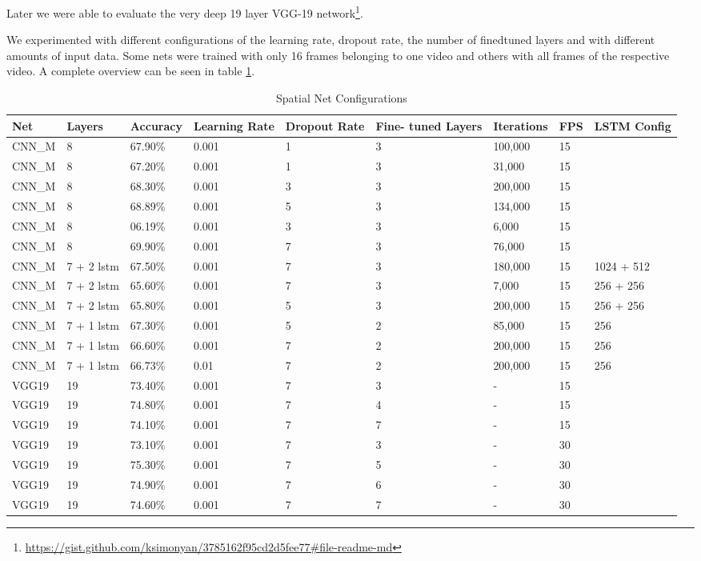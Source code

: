 Later we were able to evaluate the very deep 19 layer VGG-19 \cite{simonyan2014very} network\footnote{\url{https://gist.github.com/ksimonyan/3785162f95cd2d5fee77\#file-readme-md}}.

We experimented with different configurations of the learning rate, dropout rate, the number of finedtuned layers and with different amounts of input data. Some nets were trained with only 16 frames belonging to one video and others with all frames of the respective video. A complete overview can be seen in table \ref{table:spatial_results}.

\begin{table}[H]
\centering
\caption{Spatial Net Configurations}
\label{table:spatial_results}
\begin{tabularx}{\textwidth}{XXXXXXXXX}
\toprule
Net & Layers & Accuracy	& Learning Rate & Dropout Rate & Fine- tuned Layers	& Iterations	& FPS & LSTM Config \\ \midrule

CNN\_M & 8          & 67.90\% & 0.001 & 1 & 3 & 100,000 & 15 & \\
CNN\_M & 8          & 67.20\% & 0.001 & 1 & 3 &  31,000 & 15 & \\
CNN\_M & 8          & 68.30\% & 0.001 & 3 & 3 & 200,000 & 15 & \\
CNN\_M & 8          & 68.89\% & 0.001 & 5 & 3 & 134,000 & 15 & \\
CNN\_M & 8          & 06.19\% & 0.001 & 3 & 3 &   6,000 & 15 & \\
CNN\_M & 8          & 69.90\% & 0.001 & 7 & 3 &  76,000 & 15 & \\
CNN\_M & 7 + 2 lstm & 67.50\% & 0.001 & 7 & 3 & 180,000 & 15 & 1024 + 512 \\
CNN\_M & 7 + 2 lstm & 65.60\% & 0.001 & 7 & 3 &   7,000 & 15 & 256 + 256 \\
CNN\_M & 7 + 2 lstm & 65.80\% & 0.001 & 5 & 3 & 200,000 & 15 & 256 + 256 \\
CNN\_M & 7 + 1 lstm & 67.30\% & 0.001 & 5 & 2 &  85,000 & 15 & 256 \\
CNN\_M & 7 + 1 lstm & 66.60\% & 0.001 & 7 & 2 & 200,000 & 15 & 256 \\
CNN\_M & 7 + 1 lstm & 66.73\% &  0.01 & 7 & 2 & 200,000 & 15 & 256 \\
VGG19 & 19          & 73.40\% & 0.001 & 7 & 3 &       - & 15 & \\
VGG19 & 19          & 74.80\% & 0.001 & 7 & 4 &       - & 15 & \\
VGG19 & 19          & 74.10\% & 0.001 & 7 & 7 &       - & 15 & \\
VGG19 & 19          & 73.10\% & 0.001 & 7 & 3 &       - & 30 & \\
VGG19 & 19          & 75.30\% & 0.001 & 7 & 5 &       - & 30 & \\
VGG19 & 19          & 74.90\% & 0.001 & 7 & 6 &       - & 30 & \\
VGG19 & 19          & 74.60\% & 0.001 & 7 & 7 &       - & 30 & \\

\bottomrule
\end{tabularx}
\end{table}

